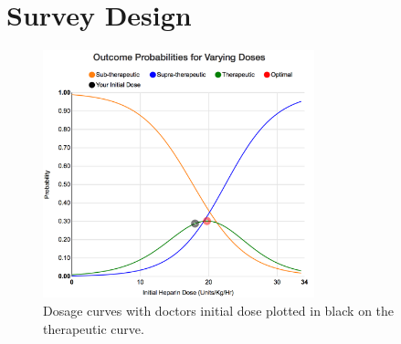 \documentclass[12pt,a4paper,]{report}
\begin{document}
\section{Survey Design}\label{survey-design}

\begin{figure}[H]
\centering
\includegraphics[width=0.7\textwidth]{source/figures/part3_iii.png}
\caption{\label{fig:part3_iii}Dosage curves with doctors initial dose plotted in black on the therapeutic curve.}
\end{figure}
\end{document}
